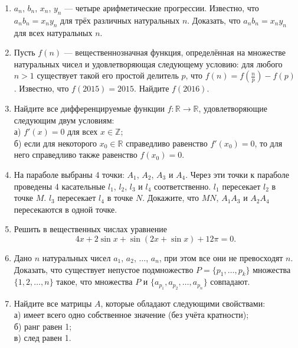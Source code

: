 \begin{enumerate}

\item $a_n$, $b_n$, $x_n$, $y_n$ --- четыре арифметические прогрессии. Известно, что $a_n b_n = x_n y_n$ для трёх различных натуральных $n$. Доказать, что $a_n b_n = x_n y_n$ для всех натуральных $n$.

\item Пусть $f(n)$ --- вещественнозначная функция, определённая на множестве натуральных чисел и удовлетворяющая следующему условию: для любого $n > 1$ существует такой его простой делитель $p$, что $f(n) = f\left( \frac{n}{p} \right) - f(p)$. Известно, что $f(2015) = 2015$. Найдите $f(2016)$.

\item Найдите все дифференцируемые функции $f: \mathbb{R} \rightarrow \mathbb{R}$, удовлетворяющие следующим двум условиям:\\
а) $f'(x) = 0$ для всех $x \in \mathbb{Z}$;\\
б) если для некоторого $x_0 \in \mathbb{R}$ справедливо равенство $f'(x_0) = 0$, то для него справедливо также равенство $f(x_0) = 0$.

\item На параболе выбраны 4 точки: $A_1$, $A_2$, $A_3$ и $A_4$. Через эти точки к параболе проведены 4 касательные $l_1$, $l_2$, $l_3$ и $l_4$ соответственно. $l_1$ пересекает $l_2$ в точке $M$. $l_3$ пересекает $l_4$ в точке $N$. Докажите, что $MN$, $A_1A_3$ и $A_2A_4$ пересекаются в одной точке.

\item Решить в вещественных числах уравнение
$$4x + 2 \sin{x} + \sin( 2x + \sin{x} ) + 12 \pi = 0.$$

\item Дано $n$ натуральных чисел $a_1$, $a_2$, $\hdots$, $a_n$, при этом все они не превосходят $n$. Доказать, что существует непустое подмножество $P = \{p_1, \hdots, p_k \}$ множества $\{1, 2, \hdots, n\}$ такое, что множества $P$ и $\{ a_{p_1}, a_{p_2}, \hdots, a_{p_n} \}$ совпадают.

\item Найдите все матрицы $A$, которые обладают следующими свойствами:\\
а) имеет всего одно собственное значение (без учёта кратности);\\
б) ранг равен 1;\\
в) след равен 1.

\end{enumerate}
